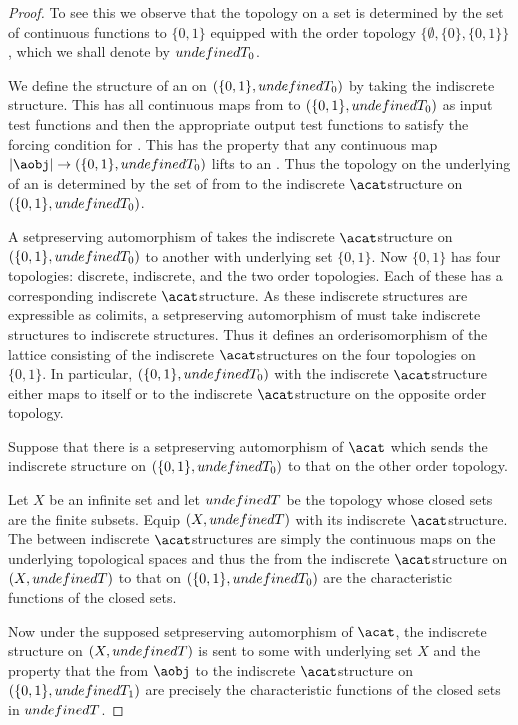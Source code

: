 \documentclass[%
a4paper,%
arxiv,%
defaults
]{myclass}
\begin{document}
\begin{proof}
To see this we observe that the topology on a set is determined by the set of continuous functions to \(\{0,1\}\) equipped with the order topology \(\{\emptyset, \{0\}, \{0,1\}\}\), which we shall denote by \(\m{T}_0\).

We define the structure of an \aobj on \((\{0,1\}, \m{T}_0)\) by taking the indiscrete structure.
This has all continuous maps from \tobjs to \((\{0,1\}, \m{T}_0)\) as input test functions and then the appropriate output test functions to satisfy the forcing condition for \acat.
This has the property that any continuous map \(\forfunc[\aobj] \to (\{0,1\}, \m{T}_0)\) lifts to an \amor.
Thus the topology on the underlying \yobj of an \aobj[\aobj] is determined by the set of \amors from \aobj to the indiscrete \(\acat\)\enhyp{}structure on \((\{0,1\}, \m{T}_0)\).

A set\enhyp{}preserving automorphism of \acat takes the indiscrete \(\acat\)\enhyp{}structure on \((\{0,1\}, \m{T}_0)\) to another \aobj with underlying set \(\{0,1\}\).
Now \(\{0,1\}\) has four topologies: discrete, indiscrete, and the two order topologies.
Each of these has a corresponding indiscrete \(\acat\)\enhyp{}structure.
As these indiscrete structures are expressible as colimits, a set\enhyp{}preserving automorphism of \acat must take indiscrete structures to indiscrete structures.
Thus it defines an order\enhyp{}isomorphism of the lattice consisting of the indiscrete \(\acat\)\enhyp{}structures on the four topologies on \(\{0,1\}\).
In particular, \((\{0,1\}, \m{T}_0)\) with the indiscrete \(\acat\)\enhyp{}structure either maps to itself or to the indiscrete \(\acat\)\enhyp{}structure on the opposite order topology.

Suppose that there is a set\enhyp{}preserving automorphism of \(\acat\) which sends the indiscrete structure on \((\{0,1\}, \m{T}_0)\) to that on the other order topology.

Let \(X\) be an infinite set and let \(\m{T}\) be the topology whose closed sets are the finite subsets.
Equip \((X, \m{T})\) with its indiscrete \(\acat\)\enhyp{}structure.
The \amors between indiscrete \(\acat\)\enhyp{}structures are simply the continuous maps on the underlying topological spaces and thus the \amors from the indiscrete \(\acat\)\enhyp{}structure on \((X,\m{T})\) to that on \((\{0,1\}, \m{T}_0)\) are the characteristic functions of the closed sets.

Now under the supposed set\enhyp{}preserving automorphism of \(\acat\), the indiscrete structure on \((X, \m{T})\) is sent to some \aobj[\aobj] with underlying set \(X\) and the property that the \amors from \(\aobj\) to the indiscrete \(\acat\)\enhyp{}structure on \((\{0,1\}, \m{T}_1)\) are precisely the characteristic functions of the closed sets in \(\m{T}\).


\end{proof}
\end{document}
